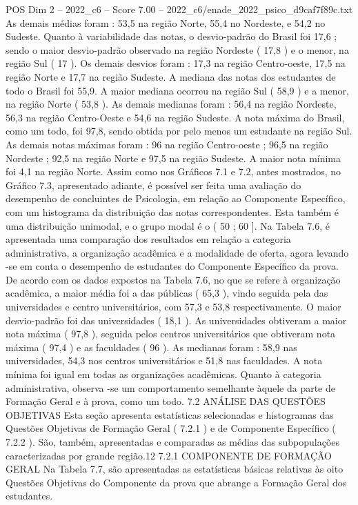 \begin{textsample}{POS Dim 2 – 2022\_c6 – Score 7.00 – 2022\_c6/enade\_2022\_psico\_d9caf7f89c.txt}
As demais médias foram : 53,5 na região Norte, 55,4 no Nordeste, e 54,2 no Sudeste.
Quanto à variabilidade das notas, o desvio-padrão do Brasil foi 17,6 ; sendo o maior desvio-padrão observado na região Nordeste ( 17,8 ) e o menor, na região Sul ( 17 ).
Os demais desvios foram : 17,3 na região Centro-oeste, 17,5 na região Norte e 17,7 na região Sudeste.
A mediana das notas dos estudantes de todo o Brasil foi 55,9.
A maior mediana ocorreu na região Sul ( 58,9 ) e a menor, na região Norte ( 53,8 ).
As demais medianas foram : 56,4 na região Nordeste, 56,3 na região Centro-Oeste e 54,6 na região Sudeste.
A nota máxima do Brasil, como um todo, foi 97,8, sendo obtida por pelo menos um estudante na região Sul.
As demais notas máximas foram : 96 na região Centro-oeste ; 96,5 na região Nordeste ; 92,5 na região Norte e 97,5 na região Sudeste.
A maior nota mínima foi 4,1 na região Norte.
Assim como nos Gráficos 7.1 e 7.2, antes mostrados, no Gráfico 7.3, apresentado adiante, é possível ser feita uma avaliação do desempenho de concluintes de Psicologia, em relação ao Componente Específico, com um histograma da distribuição das notas correspondentes.
Esta também é uma distribuição unimodal, e o grupo modal é o ( 50 ; 60 ].
Na Tabela 7.6, é apresentada uma comparação dos resultados em relação a categoria administrativa, a organização acadêmica e a modalidade de oferta, agora levando -se em conta o desempenho de estudantes do Componente Específico da prova.
De acordo com os dados expostos na Tabela 7.6, no que se refere à organização acadêmica, a maior média foi a das públicas ( 65,3 ), vindo seguida pela das universidades e centro universitários, com 57,3 e 53,8 respectivamente.
O maior desvio-padrão foi das universidades ( 18,1 ).
As universidades obtiveram a maior nota máxima ( 97,8 ), seguida pelos centros universitários que obtiveram nota máxima ( 97,4 ) e as faculdades ( 96 ).
As medianas foram : 58,9 nas universidades, 54,3 nos centros universitários e 51,8 nas faculdades.
A nota mínima foi igual em todas as organizações acadêmicas.
Quanto à categoria administrativa, observa -se um comportamento semelhante àquele da parte de Formação Geral e à prova, como um todo. 7.2 ANÁLISE DAS QUESTÕES OBJETIVAS Esta seção apresenta estatísticas selecionadas e histogramas das Questões Objetivas de Formação Geral ( 7.2.1 ) e de Componente Específico ( 7.2.2 ).
São, também, apresentadas e comparadas as médias das subpopulações caracterizadas por grande região.12 7.2.1 COMPONENTE DE FORMAÇÃO GERAL Na Tabela 7.7, são apresentadas as estatísticas básicas relativas às oito Questões Objetivas do Componente da prova que abrange a Formação Geral dos estudantes.

\end{textsample}
